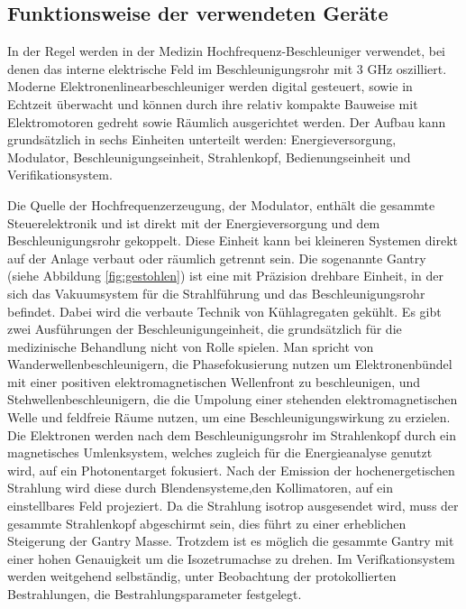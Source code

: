 





\subsection{Funktionsweise der verwendeten Geräte}
In der Regel werden in der Medizin Hochfrequenz-Beschleuniger verwendet, bei denen das interne elektrische Feld 
im Beschleunigungsrohr mit 3 GHz oszilliert. 
Moderne Elektronenlinearbeschleuniger werden digital gesteuert, sowie in Echtzeit überwacht und können durch ihre relativ kompakte Bauweise
mit Elektromotoren gedreht sowie Räumlich ausgerichtet werden.
Der Aufbau kann grundsätzlich in sechs Einheiten unterteilt werden: Energieversorgung, Modulator, Beschleunigungseinheit, Strahlenkopf, Bedienungseinheit und Verifikationsystem. \cite{KriegerHannoSfTu}


Die Quelle der Hochfrequenzerzeugung, der Modulator, enthält die gesammte Steuerelektronik und ist direkt mit der Energieversorgung und dem Beschleunigungsrohr gekoppelt.
Diese Einheit kann bei kleineren Systemen direkt auf der Anlage verbaut oder räumlich getrennt sein.
Die sogenannte Gantry (siehe Abbildung \ref{fig:gestohlen}) ist eine mit Präzision drehbare Einheit, in der sich das Vakuumsystem für die Strahlführung und das Beschleunigungsrohr befindet.
Dabei wird die verbaute Technik von Kühlagregaten gekühlt.
Es gibt zwei Ausführungen der Beschleunigungeinheit, die grundsätzlich für die medizinische Behandlung nicht von Rolle spielen.
Man spricht von Wanderwellenbeschleunigern, die Phasefokusierung nutzen um Elektronenbündel mit einer positiven elektromagnetischen Wellenfront zu beschleunigen,
und Stehwellenbeschleunigern, die die Umpolung einer stehenden elektromagnetischen Welle und feldfreie Räume nutzen, um eine Beschleunigungswirkung zu erzielen.
Die Elektronen werden nach dem Beschleunigungsrohr im Strahlenkopf durch ein magnetisches Umlenksystem, welches zugleich für die Energieanalyse genutzt wird, auf ein Photonentarget fokusiert.
Nach der Emission der hochenergetischen Strahlung wird diese durch Blendensysteme,den Kollimatoren, auf ein einstellbares Feld projeziert.
Da die Strahlung isotrop ausgesendet wird, muss der gesammte Strahlenkopf abgeschirmt sein, dies führt zu einer erheblichen Steigerung der Gantry Masse.
Trotzdem ist es möglich die gesammte Gantry mit einer hohen Genauigkeit um die Isozetrumachse zu drehen.
Im Verifkationsystem werden weitgehend selbständig, unter Beobachtung der protokollierten Bestrahlungen, die Bestrahlungsparameter festgelegt.\cite{KriegerHannoSfTu}

